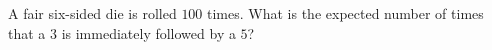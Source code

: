A fair six-sided die is rolled $100$ times. What is the expected number of times that a $3$ is immediately followed by a $5$?
